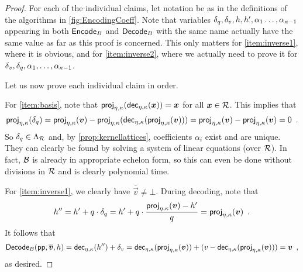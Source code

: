 \begin{proof}
For each of the individual claims, let notation be as in the definitions of the algorithms in \autoref{fig:EncodingCoeff}.
Note that variables $\delta_q,\delta_v, h, h', \alpha_1\ldots,\alpha_{\kappa-1}$ appearing in both $\mathsf{Encode}_B$ and $\mathsf{Decode}_B$ with the same name actually have the same value as far as this proof is concerned.
This only matters for \autoref{item:inverse1}, where it is obvious, and for \autoref{item:inverse2}, where we actually need to prove it for $\delta_v, \delta_q,\alpha_1,\ldots,\alpha_{\kappa-1}$.

\medskip\noindent
Let us now prove each individual claim in order.

\bigskip\noindent
For \autoref{item:basis}, note that $\mathsf{proj}_{\eta,\kappa}(\mathsf{dec}_{\eta,\kappa}(\boldsymbol{x})) = \boldsymbol{x}$ for all $\boldsymbol{x}\in\mathcal{R}$. This implies that
\[
 \mathsf{proj}_{\eta,\kappa}(\delta_q) = \mathsf{proj}_{\eta,\kappa}(\boldsymbol{v}) - \mathsf{proj}_{\eta,\kappa}(\mathsf{dec}_{\eta,\kappa}(\mathsf{proj}_{\eta,\kappa}(\boldsymbol{v}))) = \mathsf{proj}_{\eta,\kappa}(\boldsymbol{v}) - \mathsf{proj}_{\eta,\kappa}(\boldsymbol{v}) = 0\enspace.
\]
So $\delta_q\in\Lambda_{\mathcal{R}}$ and, by \autoref{prop:kernellattices}, coefficients $\alpha_i$ exist and are unique.
They can clearly be found by solving a system of linear equations (over $\mathcal{R}$).
In fact, $\mathcal{B}$ is already in appropriate echelon form, so this can even be done without divisions in $\mathcal{R}$ and is clearly polynomial time.

\bigskip\noindent
For \autoref{item:inverse1}, we clearly have $\overline{\vec{v}} \neq \bot$.
During decoding, note that
\[
 h'' = h' + q\cdot\delta_q = h'+q\cdot\frac{\mathsf{proj}_{\eta,\kappa}(\boldsymbol{v})-h'}{q} = \mathsf{proj}_{\eta,\kappa}(\boldsymbol{v})\enspace.
\]
It follows that
\[
 \mathsf{Decode}_B(\mathsf{pp},\overline{\boldsymbol{v}}, h) = \mathsf{dec}_{\eta,\kappa}(h'') + \delta_v = \mathsf{dec}_{\eta,\kappa}(\mathsf{proj}_{\eta,\kappa}(\boldsymbol{v})) + (v - \mathsf{dec}_{\eta,\kappa}(\mathsf{proj}_{\eta,\kappa}(\boldsymbol{v}))) = \boldsymbol{v}\enspace,
\]
as desired.



\end{proof}

